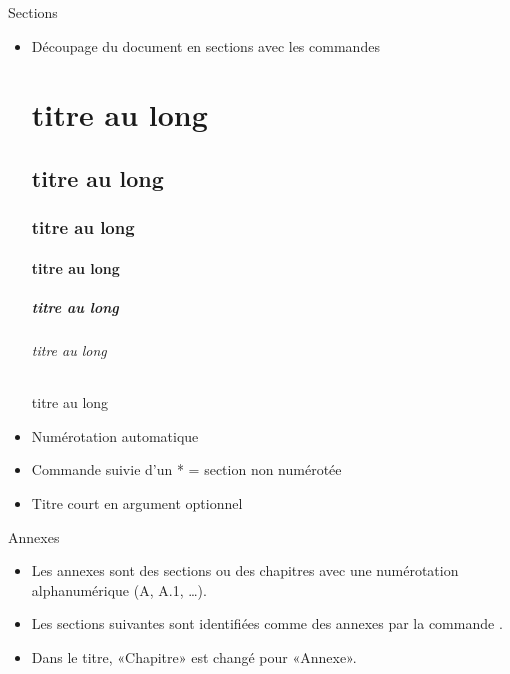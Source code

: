 \begin{frame}[fragile]{Sections}
	\begin{itemize}
		\item Découpage du document en sections avec les commandes
\begin{codesource}
	\part[titre court]{titre au long}
	\chapter[titre court]{titre au long}
	\section[titre court]{titre au long}
	\subsection[titre court]{titre au long}
	
	\subsubsection[titre court]{titre au long} 	%
	
	\paragraph[titre court]{titre au long} 		%
	\subparagraph[titre court]{titre au long} 	%
\end{codesource}

		\item Numérotation automatique
		\item Commande suivie d'un * = section non numérotée
		\item Titre court en argument optionnel
	\end{itemize}
\end{frame}

\begin{frame}[fragile,c]{Annexes}
	\begin{itemize}
		\item Les annexes sont des sections ou des chapitres avec une numérotation alphanumérique (A,
		A.1, \ldots).
		\item Les sections suivantes sont identifiées comme des annexes par la commande 
			.
		\item Dans le titre, «Chapitre» est changé pour «Annexe».
	\end{itemize}
\end{frame}

